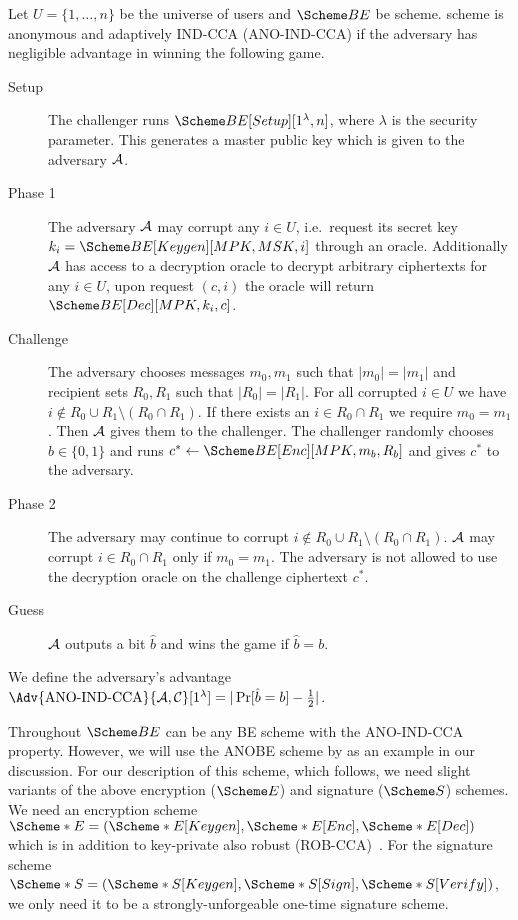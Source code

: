 \begin{definition}\label{ANO-IND-CCA}
  Let \(U = \{1, \ldots, n\}\) be the universe of users and \(\BE\) be  
  scheme.
   scheme is anonymous and adaptively IND-CCA (ANO-IND-CCA) if the 
  adversary has negligible advantage in winning the following game.
  \begin{description}
    \item[Setup] The challenger runs \(\BE[Setup][1^\lambda, n]\), where 
      \(\lambda\) is the security parameter.
      This generates a master public key which is given to the adversary 
      \(\A\).

    \item[Phase 1] The adversary \(\A\) may corrupt any \(i\in U\), i.e.\ 
      request its secret key \(k_i = \BE[Keygen][MPK, MSK, i]\) through an 
      oracle.
      Additionally \(\A\) has access to a decryption oracle to decrypt 
      arbitrary ciphertexts for any \(i\in U\), upon request \((c, i)\) the 
      oracle will return \(\BE[Dec][MPK, k_i, c]\).

    \item[Challenge] The adversary chooses messages \(m_0, m_1\) such that 
      \(|m_0| = |m_1|\) and recipient sets \(R_0, R_1\) such that \(|R_0| 
        = |R_1|\).
      For all corrupted \(i\in U\) we have \(i\notin R_0\cup R_1\setminus 
        (R_0\cap R_1)\).
      If there exists an \(i\in R_0\cap R_1\) we require \(m_0 = m_1\).
      Then \(\A\) gives them to the challenger.
      The challenger randomly chooses \(b\in \{0, 1\}\) and runs \(c^*\gets 
        \BE[Enc][MPK, m_b, R_b]\) and gives \(c^*\) to the adversary.

    \item[Phase 2] The adversary may continue to corrupt \(i\notin R_0\cup 
        R_1\setminus (R_0\cap R_1)\).
      \(\A\) may corrupt \(i\in R_0\cap R_1\) only if \(m_0 = m_1\).
      The adversary is not allowed to use the decryption oracle on the 
      challenge ciphertext \(c^*\).

    \item[Guess] \(\A\) outputs a bit \(\hat{b}\) and wins the game if 
      \(\hat{b} = b\).

  \end{description}
  We define the adversary's advantage \(\Adv{\text{ANO-IND-CCA}}{\A, 
      \Cop}[1^\lambda] = |\Pr[ \hat{b} = b ] - \frac{1}{2}|\).
\end{definition}

Throughout \(\BE\) can be any \ac{BE} scheme with the ANO-IND-CCA property.
However, we will use the \ac{ANOBE} scheme by \citet{ANOBE} as an example in 
our discussion.
For our description of this scheme, which follows, we need slight variants of 
the above encryption (\(\E\)) and signature (\(\S\)) schemes.
We need an encryption scheme \(\E* = (\E*[Keygen], \E*[Enc], \E*[Dec])\) which 
is in addition to key-private also robust (ROB-CCA)~\cite{RobustEncryption}.
For the signature scheme \(\S* = (\S*[Keygen], \S*[Sign], \S*[Verify])\), we 
only need it to be a strongly-unforgeable one-time signature scheme.
